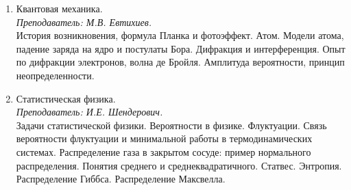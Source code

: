 \documentclass[11pt]{article}
\newlength{\h}
\newlength{\x}
\begin{document}
\begin{enumerate}
\item Квантовая механика.\\[0.2cm]
  \textit{Преподаватель: М.В. Евтихиев.}\\[0.2cm]
  История возникновения, формула Планка и фотоэффект. Атом. Модели
  атома, падение заряда на ядро и постулаты Бора. Дифракция и
  интерференция. Опыт по дифракции электронов, волна де
  Бройля. Амплитуда вероятности, принцип неопределенности.
  
\item Статистическая физика. \\[0.2cm]
  \textit{Преподаватель: И.Е. Шендерович.}\\[0.2cm]
  Задачи статистической физики. Вероятности в
  физике. Флуктуации. Связь вероятности флуктуации и минимальной
  работы в термодинамических системах. Распределение газа в закрытом
  сосуде: пример нормального распределения. Понятия среднего и
  среднеквадратичного. Статвес. Энтропия. Распределение
  Гиббса. Распределение Максвелла.
  

\end{enumerate}
\end{document}
